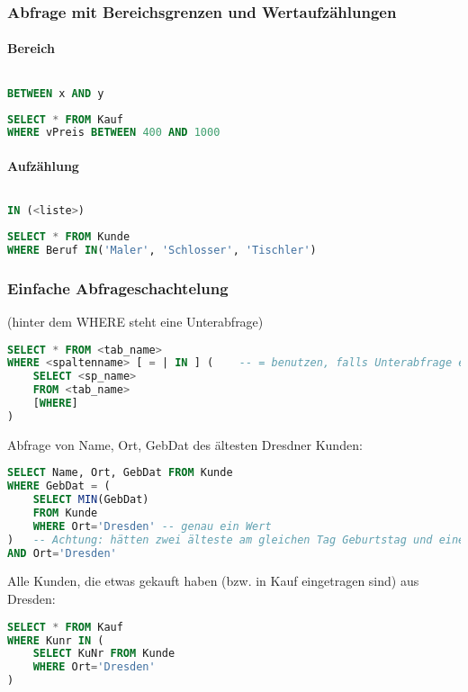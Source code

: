 \subsubsection{Abfrage mit Bereichsgrenzen und Wertaufzählungen}
\paragraph{Bereich} $ $
\begin{lstlisting}[language=SQL]
BETWEEN x AND y
\end{lstlisting}
\begin{lstlisting}[language=SQL]
SELECT * FROM Kauf
WHERE vPreis BETWEEN 400 AND 1000
\end{lstlisting}
\paragraph{Aufzählung} $ $
\begin{lstlisting}[language=SQL]
IN (<liste>)
\end{lstlisting}
\begin{lstlisting}[language=SQL]
SELECT * FROM Kunde
WHERE Beruf IN('Maler', 'Schlosser', 'Tischler')
\end{lstlisting}

\subsubsection{Einfache Abfrageschachtelung}
(hinter dem WHERE steht eine Unterabfrage)
\begin{lstlisting}[language=SQL]
SELECT * FROM <tab_name>
WHERE <spaltenname> [ = | IN ] (	-- = benutzen, falls Unterabfrage einzelnen Wert zurück gibt, IN-Operator benutzen, falls eine Wertliste durch Unterabfrage erzeugt wird
	SELECT <sp_name>
	FROM <tab_name>
	[WHERE]
)
\end{lstlisting}
Abfrage von Name, Ort, GebDat des ältesten Dresdner Kunden:
\begin{lstlisting}[language=SQL]
SELECT Name, Ort, GebDat FROM Kunde
WHERE GebDat = (
	SELECT MIN(GebDat)
	FROM Kunde
	WHERE Ort='Dresden'	-- genau ein Wert
)	-- Achtung: hätten zwei älteste am gleichen Tag Geburtstag und einer würde nicht aus Dresden kommen, dann würde diese mit angegeben. Also:
AND Ort='Dresden'
\end{lstlisting}
Alle Kunden, die etwas gekauft haben (bzw. in Kauf eingetragen sind) aus Dresden:
\begin{lstlisting}[language=SQL]
SELECT * FROM Kauf
WHERE Kunr IN (
	SELECT KuNr FROM Kunde
	WHERE Ort='Dresden'
)
\end{lstlisting}

